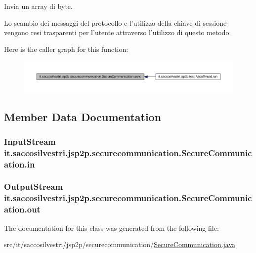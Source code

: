 \-Invia un array di byte. 

\-Lo scambio dei messaggi del protocollo e l'utilizzo della chiave di sessione vengono resi trasparenti per l'utente attraverso l'utilizzo di questo metodo. 

\-Here is the caller graph for this function\-:
\nopagebreak
\begin{figure}[H]
\begin{center}
\leavevmode
\includegraphics[width=350pt]{classit_1_1saccosilvestri_1_1jsp2p_1_1securecommunication_1_1_secure_communication_ab5b1a396ec73873683012ac34084e3f9_icgraph}
\end{center}
\end{figure}




\subsection{\-Member \-Data \-Documentation}
\hypertarget{classit_1_1saccosilvestri_1_1jsp2p_1_1securecommunication_1_1_secure_communication_a007b240b59e1189f3994e735dae50ea5}{
\subsubsection[{in}]{\setlength{\rightskip}{0pt plus 5cm}\-Input\-Stream {\bf it.\-saccosilvestri.\-jsp2p.\-securecommunication.\-Secure\-Communication.\-in}}}
\label{classit_1_1saccosilvestri_1_1jsp2p_1_1securecommunication_1_1_secure_communication_a007b240b59e1189f3994e735dae50ea5}
\hypertarget{classit_1_1saccosilvestri_1_1jsp2p_1_1securecommunication_1_1_secure_communication_a35e77cca97b78b630af1d7a4084133ad}{
\subsubsection[{out}]{\setlength{\rightskip}{0pt plus 5cm}\-Output\-Stream {\bf it.\-saccosilvestri.\-jsp2p.\-securecommunication.\-Secure\-Communication.\-out}}}
\label{classit_1_1saccosilvestri_1_1jsp2p_1_1securecommunication_1_1_secure_communication_a35e77cca97b78b630af1d7a4084133ad}


\-The documentation for this class was generated from the following file\-:\begin{DoxyCompactItemize}
\item 
src/it/saccosilvestri/jsp2p/securecommunication/\hyperlink{_secure_communication_8java}{\-Secure\-Communication.\-java}\end{DoxyCompactItemize}
